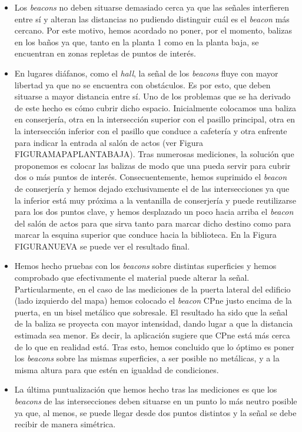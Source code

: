 \begin{itemize}
	\item Los \textit{beacons} no deben situarse demasiado cerca ya que las señales interfieren entre sí y alteran las distancias no pudiendo distinguir cuál es el \textit{beacon} más cercano. Por este motivo, hemos acordado no poner, por el momento, balizas en los baños ya que, tanto en la planta 1 como en la planta baja, se encuentran en zonas repletas de puntos de interés.
	
	\item En lugares diáfanos, como el \textit{hall}, la señal de los \textit{beacons} fluye con mayor libertad ya que no se encuentra con obstáculos. Es por esto, que deben situarse a mayor distancia entre sí. Uno de los problemas que se ha derivado de este hecho es cómo cubrir dicho espacio. Inicialmente colocamos una baliza en conserjería, otra en la intersección superior con el pasillo principal, otra en la intersección inferior con el pasillo que conduce a cafetería y otra enfrente para indicar la entrada al salón de actos (ver Figura FIGURAMAPAPLANTABAJA). Tras numerosas mediciones, la solución que proponemos es colocar las balizas de modo que una pueda servir para cubrir dos o más puntos de interés. Consecuentemente, hemos suprimido el \textit{beacon} de conserjería y hemos dejado exclusivamente el de las intersecciones ya que la inferior está muy próxima a la ventanilla de conserjería y puede reutilizarse para los dos puntos clave, y hemos desplazado un poco hacia arriba el \textit{beacon} del salón de actos para que sirva tanto para marcar dicho destino como para marcar la esquina superior que conduce hacia la biblioteca. En la Figura FIGURANUEVA se puede ver el resultado final.
	
	\item Hemos hecho pruebas con los \textit{beacons} sobre distintas superficies y hemos comprobado que efectivamente el material puede alterar la señal. Particularmente, en el caso de las mediciones de la puerta lateral del edificio (lado izquierdo del mapa) hemos colocado el \textit{beacon} CPne justo encima de la puerta, en un bisel metálico que sobresale. El resultado ha sido que la señal de la baliza se proyecta con mayor intensidad, dando lugar a que la distancia estimada sea menor. Es decir, la aplicación sugiere que CPne está más cerca de lo que en realidad está. Tras esto, hemos concluido que lo óptimo es poner los \textit{beacons} sobre las mismas superficies, a ser posible no metálicas, y a la misma altura para que estén en igualdad de condiciones. 
	
	\item La última puntualización que hemos hecho tras las mediciones es que los \textit{beacons} de las intersecciones deben situarse en un punto lo más neutro posible ya que, al menos, se puede llegar desde dos puntos distintos y la señal se debe recibir de manera simétrica. 
\end{itemize}


